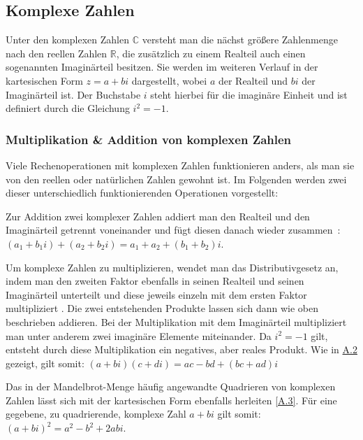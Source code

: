 \subsection{Komplexe Zahlen}\label{subsec:complex-numbers}

Unter den komplexen Zahlen $\mathbb{C}$ versteht man die nächst größere Zahlenmenge
nach den reellen Zahlen $\mathbb{R}$,
die zusätzlich zu einem Realteil auch einen sogenannten Imaginärteil besitzen.
Sie werden im weiteren Verlauf in der kartesischen Form
$z = a + bi$ dargestellt, wobei $a$ der Realteil und $bi$ der Imaginärteil ist.
Der Buchstabe $i$ steht hierbei für die imaginäre Einheit und
ist definiert durch die Gleichung $i^2 = -1$.

\subsubsection{Multiplikation \& Addition von komplexen Zahlen}
\label{subsubsec:addition-and-multiplication-of-complex-numbers}

Viele Rechenoperationen mit komplexen Zahlen funktionieren anders, als man sie
von den reellen oder natürlichen Zahlen gewohnt ist.
Im Folgenden werden zwei dieser unterschiedlich funktionierenden
Operationen vorgestellt:

Zur Addition zwei komplexer Zahlen addiert man den
Realteil und den Imaginärteil getrennt voneinander und fügt diesen
danach wieder zusammen~\cite[S. 2]{lichtenegger_komplexe_2002}:
$(a_1 + {b_1}i) + (a_2 + {b_2}i) = a_1 + a_2 + (b_1 + b_2)i$.

Um komplexe Zahlen zu multiplizieren, wendet man das Distributivgesetz an,
indem man den zweiten Faktor ebenfalls in seinen Realteil und seinen
Imaginärteil unterteilt und diese jeweils einzeln mit dem ersten Faktor multipliziert
\cite[S. 2f.]{lichtenegger_komplexe_2002}.
Die zwei entstehenden Produkte lassen sich dann wie oben beschrieben addieren.
Bei der Multiplikation mit dem Imaginärteil multipliziert man unter anderem
zwei imaginäre Elemente miteinander.
Da $i^2 = -1$ gilt, entsteht durch diese Multiplikation
ein negatives, aber reales Produkt.
Wie in \hyperref[app:2]{A.2} gezeigt, gilt somit:
$ (a + bi)(c + di) = ac - bd + (bc + ad)i $

Das in der Mandelbrot-Menge häufig angewandte Quadrieren von komplexen Zahlen
lässt sich mit der kartesischen Form ebenfalls herleiten \hyperref[app:3]{[A.3]}.
Für eine gegebene, zu quadrierende, komplexe Zahl $a + bi$ gilt somit:
$(a + bi)^2 = a^2 - b^2 + 2abi$.


